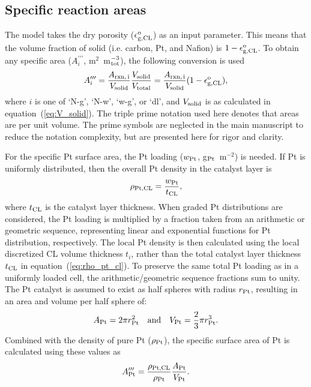 \documentclass[final,3p,times,onecolumn]{elsarticle}    %
\begin{document}
\subsection{Specific reaction areas}
The model takes the dry porosity ($\epsilon_{\rm g,CL}^{\rm o}$) as an input parameter. This means that the volume fraction of solid (i.e. carbon, Pt, and Nafion) is $1 - \epsilon_{\rm g,CL}^{\rm o}$. To obtain any specific area ($A_{i}^{\prime\prime\prime}$, m$^2$~m$^{-3}_{\rm tot}$), the following conversion is used
\begin{equation} \label{eq:specific-rxn-areas}
    A_{i}^{\prime\prime\prime} 
    = \frac{A_{\rm rxn,\,i}}{V_{\rm solid}} \frac{V_{\rm solid}}{V_{\rm total}} 
    = \frac{A_{\rm rxn,\,i}}{V_{\rm solid}} (1 - \epsilon_{\rm g,CL}^{\rm o}),
\end{equation}
where $i$ is one of `N-g',  `N-w', `w-g', or `dl', and $V_{\rm solid}$ is as calculated in equation~(\ref{eq:V_solid}). The triple prime notation used here denotes that areas are per unit volume. The prime symbols are neglected in the main manuscript to reduce the notation complexity, but are presented here for rigor and clarity. 

For the specific Pt surface area, the Pt loading ($w_{\rm Pt}$, g$_{\rm Pt}$~m$^{-2}$) is needed. If  Pt is uniformly distributed, then the overall Pt density in the catalyst layer is
\begin{equation}\label{eq:rho_pt_cl}
    \rho_{\rm Pt, CL} = \frac{w_{\rm Pt}}{t_{\rm CL}},
\end{equation}
where $t_{\rm CL}$ is the catalyst layer thickness. When graded Pt distributions are considered, the Pt loading is multiplied by a fraction taken from an arithmetic or geometric sequence, representing linear and exponential functions for Pt distribution, respectively. The local Pt density is then calculated using the local discretized CL volume thickness $t_i$, rather than the total catalyst layer thickness $t_{\rm CL}$ in equation~(\ref{eq:rho_pt_cl}). To preserve the same total Pt loading as in a uniformly loaded cell, the arithmetic/geometric sequence fractions sum to unity. The Pt catalyst is assumed to exist as half spheres with radius $r_{\rm Pt}$, resulting in an area and volume per half sphere of:
\begin{equation}
    A_{\rm Pt} = 2 \pi r_{\rm Pt}^2 \quad \textrm{and} \quad V_{\rm Pt} = \frac{2}{3} \pi r_{\rm Pt}^3.
\end{equation}
Combined with the density of pure Pt ($\rho_{\rm Pt}$), the specific surface area of Pt is calculated using these values as
\begin{equation}
    A_{\rm Pt}^{\prime\prime\prime} 
    = \frac{\rho_{\rm Pt, CL}}{\rho_{\rm Pt}} \frac{A_{\rm Pt}}{V_{\rm Pt}}.
\end{equation}
\end{document}
